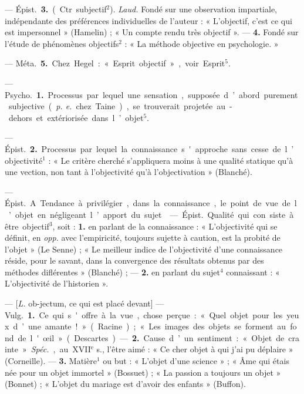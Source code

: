 \begin{itemize}[leftmargin=1cm, label=, itemsep=1pt]
— \si{Épist.} {\bf 3.} (Ctr. subjectif$^2$).
{\it Laud.} Fondé sur une observation
impartiale, indépendante des préférences individuelles de l’auteur :
« L'objectif, c’est ce qui est impersonnel » (Hamelin) ; « Un compte
rendu très objectif ». — {\bf 4.} Fondé
sur l'étude de phénomènes objectifs$^2$ : « La méthode objective en
psychologie. »

— \si{Méta.} {\bf 5.} Chez Hegel : « Esprit
objectif », voir Esprit$^5$.

 — \si{Psycho.} {\bf 1.} Processus
par lequel une sensation, supposée d’abord purement subjective
({\it p. e.} chez Taine), se trouverait
projetée au-dehors et extériorisée
dans l’objet$^5$.

— \si{Épist.} {\bf 2.} Processus par lequel
la connaissance s'approche sans
cesse de l’objectivité$^1$ : « Le critère
cherché s’appliquera moins à une
qualité statique qu’à une vection,
non tant à l’objectivité qu’à l’objectivation » (Blanché).

 — \si{Épist.} A. Tendance
à privilégier, dans la connaissance,
le point de vue de l’objet en négligeant l’apport du sujet.

 — \si{Épist.} Qualité qui con
siste à être objectif$^3$, soit : {\bf 1.} en
parlant de la connaissance : « L'objectivité qui se définit, en {\it opp.} avec
l'empiricité, toujours sujette à caution, est la probité de l’objet » (Le
Senne) ; « Le meilleur indice de
l’objectivité d’une connaissance réside, pour le savant, dans la convergence des résultats obtenus par des
méthodes diflérentes » (Blanché) ; —
 {\bf 2.} en parlant du sujet$^4$ connaissant :
« L’objectivité de l'historien ».

 — [{\it L.} ob-jectum, ce qui est placé
devant] — \si{Vulg.} {\bf 1.} Ce qui s'offre à
la vue, chose perçue : « Quel objet
pour les yeux d’une amante ! »
(Racine) ; « Les images des objets se
forment au fond de l'œil » (Descartes). — {\bf 2.} Cause d’un sentiment :
« Objet de crainte ». {\it Spéc.}, au
{\footnotesize XVII}$^\text{e}$ s., l'être aimé : « Ce cher objet
à qui j'ai pu déplaire » (Corneille). —
 {\bf 3.} Matière$^1$ ou but : « L'objet d’une
science » ; « Âme qui étais née pour
un objet immortel » (Bossuet) ; « La
passion a toujours un objet » (Bonnet) ; « L'objet du mariage est d’avoir
des enfants » (Buffon).


\end{itemize}

